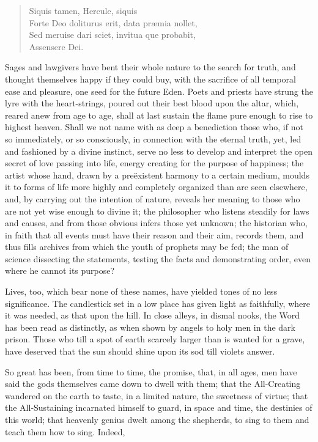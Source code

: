 \begin{verse}
\hspace{1.1em} Siquis tamen, Hercule, siquis\\
Forte Deo doliturus erit, data pr\ae mia nollet,\\
Sed meruise dari sciet, invitua que probabit,\\
\hspace{1.1em} Assensere Dei.
\end{verse}

Sages and lawgivers have bent their whole nature to the search for
truth, and thought themselves happy if they could buy, with the
sacrifice of all temporal ease and pleasure, one seed for the future
Eden. Poets and priests have strung the lyre with the heart-strings,
poured out their best blood upon the altar, which, reared anew
 from age to age, shall at last sustain the flame pure enough
to rise to highest heaven. Shall we not name with as deep a
benediction those who, if not so immediately, or so consciously, in
connection with the eternal truth, yet, led and fashioned by a divine
instinct, serve no less to develop and interpret the open secret of
love passing into life, energy creating for the purpose of happiness;
the artist whose hand, drawn by a pre\"{e}xistent harmony to a certain
medium, moulds it to forms of life more highly and completely
organized than are seen elsewhere, and, by carrying out the intention
of nature, reveals her meaning to those who are not yet wise enough to
divine it; the philosopher who listens steadily for laws and causes,
and from those obvious infers those yet unknown; the historian who, in
faith that all events must have their reason and their aim, records
them, and thus fills archives from which the youth of prophets may be
fed; the man of science dissecting the statements, testing the facts
and demonstrating order, even where he cannot its purpose?

Lives, too, which bear none of these names, have yielded tones of no
less significance. The candlestick set in a low place has given light
as faithfully, where it was needed, as that upon the hill. In close
alleys, in dismal nooks, the Word has been read as distinctly, as when
shown by angels to holy men in the dark prison. Those who till a spot
of earth scarcely larger than is wanted for a grave, have deserved
that the sun should shine upon its sod till violets answer.

So great has been, from time to time, the promise,  that, in
all ages, men have said the gods themselves came down to dwell with
them; that the All-Creating wandered on the earth to taste, in a
limited nature, the sweetness of virtue; that the All-Sustaining
incarnated himself to guard, in space and time, the destinies of this
world; that heavenly genius dwelt among the shepherds, to sing to them
and teach them how to sing. Indeed,

